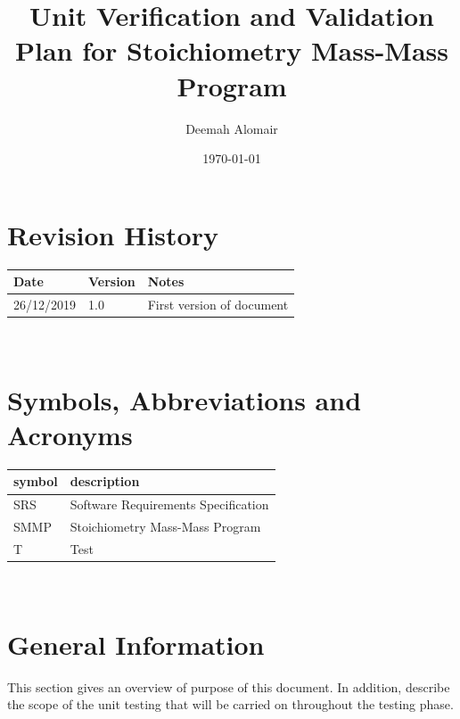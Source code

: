 \documentclass[12pt, titlepage]{article}
\begin{document}
\title{Unit Verification and Validation Plan for Stoichiometry Mass-Mass Program } 
\author{Deemah Alomair}
\date{\today}
	
\maketitle


\section{Revision History}

\begin{tabularx}{\textwidth}{p{3cm}p{2cm}X}
\toprule {\bf Date} & {\bf Version} & {\bf Notes}\\
\midrule
26/12/2019 & 1.0 & First version of document\\
\bottomrule
\end{tabularx}

~\newpage

\tableofcontents

\listoftables 

\listoffigures
\newpage

\section{Symbols, Abbreviations and Acronyms}

\renewcommand{\arraystretch}{1.2}
\begin{tabular}{l l} 
  \toprule		
  \textbf{symbol} & \textbf{description}\\
  \midrule 
  SRS & Software Requirements Specification \\
  SMMP & Stoichiometry Mass-Mass Program \\
  T & Test \\
  \bottomrule
\end{tabular}\\


\newpage


\section{General Information}

This section gives an overview of purpose of this document. In addition, describe the scope of the unit testing that will be carried on throughout the testing phase. 
\end{document}
